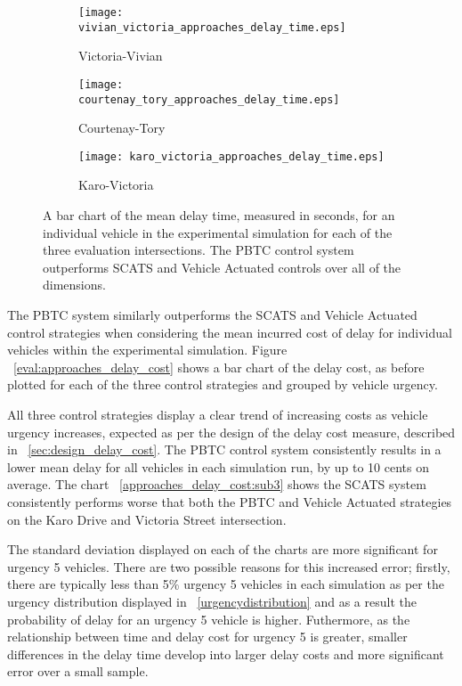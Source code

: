 \begin{figure}
\centering
\begin{subfigure}{.5\textwidth}
  \centering
  \texttt{[image: vivian\_victoria\_approaches\_delay\_time.eps]}
  \caption{Victoria-Vivian}
  \label{approaches_delay_time:sub1}
\end{subfigure}%
\begin{subfigure}{.5\textwidth}
  \centering
  \texttt{[image: courtenay\_tory\_approaches\_delay\_time.eps]}
  \caption{Courtenay-Tory}
  \label{approaches_delay_time:sub2}
\end{subfigure}

\vspace{1cm}

\begin{subfigure}{.5\textwidth}
  \centering
  \texttt{[image: karo\_victoria\_approaches\_delay\_time.eps]}
  \caption{Karo-Victoria}
  \label{approaches_delay_time:sub3}
\end{subfigure}%
\caption{ A bar chart of the mean delay time, measured in seconds, for an individual vehicle in the experimental simulation for each of the three evaluation intersections. The PBTC control system outperforms SCATS and Vehicle Actuated controls over all of the dimensions.  }
\label{eval:approaches_delay_time}
\end{figure}

The PBTC system similarly outperforms the SCATS and Vehicle Actuated control strategies when considering the mean incurred cost of delay for individual vehicles within the experimental simulation. Figure ~\ref{eval:approaches_delay_cost} shows a bar chart of the delay cost, as before plotted for each of the three control strategies and grouped by vehicle urgency. 

All three control strategies display a clear trend of increasing costs as vehicle urgency increases, expected as per the design of the delay cost measure, described in ~\ref{sec:design_delay_cost}. The PBTC control system consistently results in a lower mean delay for all vehicles in each simulation run, by up to 10 cents on average. The chart ~\ref{approaches_delay_cost:sub3} shows the SCATS system consistently performs worse that both the PBTC and Vehicle Actuated strategies on the Karo Drive and Victoria Street intersection.

The standard deviation displayed on each of the charts are more significant for urgency 5 vehicles. There are two possible reasons for this increased error; firstly, there are typically less than 5\% urgency 5 vehicles in each simulation as per the urgency distribution displayed in ~\ref{urgencydistribution} and as a result the probability of delay for an urgency 5 vehicle is higher. Futhermore, as the relationship between time and delay cost for urgency 5 is greater, smaller differences in the delay time develop into larger delay costs and more significant error over a small sample.

